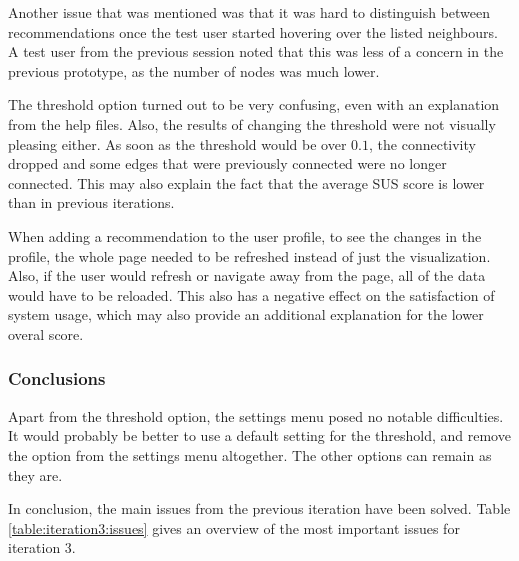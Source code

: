 Another issue that was mentioned was that it was hard to distinguish between recommendations once the test user started hovering over the listed neighbours. A test user from the previous session noted that this was less of a concern in the previous prototype, as the number of nodes was much lower.

The threshold option turned out to be very confusing, even with an explanation from the help files. Also, the results of changing the threshold were not visually pleasing either. As soon as the threshold would be over $0.1$, the connectivity dropped and some edges that were previously connected were no longer connected. This may also explain the fact that the average SUS score is lower than in previous iterations.

When adding a recommendation to the user profile, to see the changes in the profile, the whole page needed to be refreshed instead of just the visualization. Also, if the user would refresh or navigate away from the page, all of the data would have to be reloaded. This also has a negative effect on the satisfaction of system usage, which may also provide an additional explanation for the lower overal score.



\subsubsection{Conclusions}\label{chapter:prototype:section:soundsuggest2:conclusion}

Apart from the threshold option, the settings menu posed no notable difficulties. It would probably be better to use a default setting for the threshold, and remove the option from the settings menu altogether. The other options can remain as they are.

In conclusion, the main issues from the previous iteration have been solved. Table \ref{table:iteration3:issues} gives an overview of the most important issues for iteration $3$.

